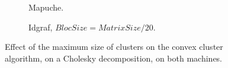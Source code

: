 \documentclass[10pt, conference, compsocconf,pdftex,dvipsnames]{IEEEtran}
\begin{document}

\begin{figure}[htb]
    \centering
    \begin{subfigure}{0.5\textwidth}
        \scalebox{0.65}{
            
        }
        \caption{Mapuche.}
        \label{fig:ClustersMapuche}
    \end{subfigure}
    \begin{subfigure}{0.5\textwidth}
        \scalebox{0.65}{
            
        }
        \caption{Idgraf, $BlocSize=MatrixSize/20$.}
        \label{fig:ClustersIdgraf}
    \end{subfigure}

    \caption{Effect of the maximum size of clusters on the convex cluster
    algorithm, on a Cholesky decomposition, on both machines.}
    \label{fig:Clusters}
\end{figure}


\end{document}
